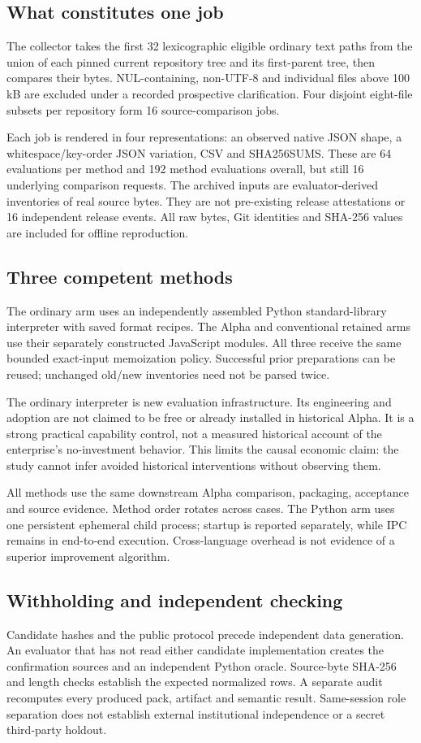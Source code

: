 \documentclass[11pt,a4paper]{article}
\begin{document}
\subsection{What constitutes one job}
The collector takes the first 32 lexicographic eligible ordinary text paths from
the union of each pinned current repository tree and its first-parent tree,
then compares their bytes. NUL-containing, non-UTF-8 and individual files above 100 kB are excluded
under a recorded prospective clarification. Four disjoint eight-file subsets per
repository form 16 source-comparison jobs.

Each job is rendered in four representations: an observed native JSON shape,
a whitespace/key-order JSON variation, CSV and SHA256SUMS. These are 64 evaluations
per method and 192 method evaluations overall, but still 16 underlying comparison
requests. The archived inputs are evaluator-derived inventories of real source
bytes. They are not pre-existing release attestations or 16 independent release
events. All raw bytes, Git identities and SHA-256 values are included for offline
reproduction.

\subsection{Three competent methods}
The ordinary arm uses an independently assembled Python standard-library
interpreter with saved format recipes. The Alpha and conventional retained arms
use their separately constructed JavaScript modules. All three receive the same
bounded exact-input memoization policy. Successful prior preparations can be
reused; unchanged old/new inventories need not be parsed twice.

The ordinary interpreter is new evaluation infrastructure. Its engineering and
adoption are not claimed to be free or already installed in historical Alpha.
It is a strong practical capability control, not a measured historical account
of the enterprise's no-investment behavior. This limits the causal economic claim:
the study cannot infer avoided historical interventions without observing them.

All methods use the same downstream Alpha comparison, packaging, acceptance and
source evidence. Method order rotates across cases. The Python arm uses one
persistent ephemeral child process; startup is reported separately, while IPC
remains in end-to-end execution. Cross-language overhead is not evidence of a
superior improvement algorithm.

\subsection{Withholding and independent checking}
Candidate hashes and the public protocol precede independent data generation.
An evaluator that has not read either candidate implementation creates the
confirmation sources and an independent Python oracle. Source-byte SHA-256 and
length checks establish the expected normalized rows. A separate audit recomputes
every produced pack, artifact and semantic result. Same-session role separation
does not establish external institutional independence or a secret third-party
holdout.
\end{document}
